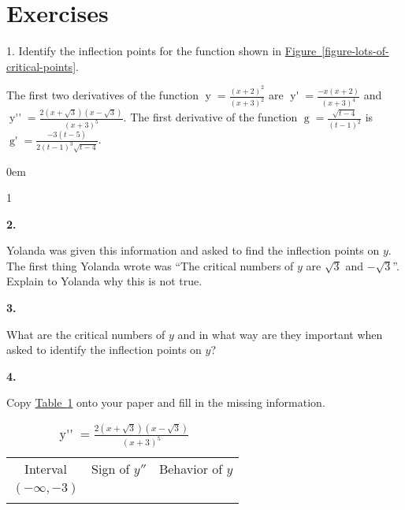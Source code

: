 \documentclass[12pt,]{book}
\theoremstyle{plain}
\theoremstyle{definition}
\numberwithin{equation}{section}
\newcommand{\hrulethin}  {\noalign{\hrule height 0.04em}}
\newcommand{\hrulemedium}{\noalign{\hrule height 0.07em}}
\newcommand{\hrulethick} {\noalign{\hrule height 0.11em}}
\newenvironment{exercisegroup}%
{\medskip\noindent}%
{\par\bigskip}%
\newlength{\exercisegroupindent}%
\newlength{\exercisegroupitemwidth}%
\newenvironment{exercisegrouplist}%
{\vspace{-\partopsep}%
\begin{adjustwidth}{\exercisegroupindent}{0em}}%
{\end{adjustwidth}%
\vspace{-\partopsep}%
\vspace{\baselineskip}}%
\newenvironment{exercisegroupbycol}[1]%
{\begin{exercisegrouplist}%
\vspace{-\multicolsep}%
\begin{multicols}{#1}%
\setlength{\parindent}{0em}%
\setlength{\exercisegroupitemwidth}{\linewidth}}%
{\end{multicols}%
\vspace{-\multicolsep}%
\end{exercisegrouplist}}%
\newenvironment{exercisegroupitem}[1]%
{\begin{minipage}[t]{\exercisegroupitemwidth}
\vspace{0pt}%
{\bfseries#1}%
\rule{0pt}{\baselineskip}}{\strut%
\end{minipage}%
\hspace{\columnsep}}%
\providecommand\phantomsection{}
\newcommand{\fe}[2]{\mathop{{#1}{\left(#2\right)}}}
\newcommand{\ointerval}[2]{\left(#1,#2\right)}
\newcommand{\fd}[1]{#1'}
\newcommand{\sd}[1]{#1''}
\begin{document}
\section*{Exercises}\label{exercises-50}

\begin{exerciselist}
\item[1.]\phantomsection\hypertarget{exercise-428}{\null}Identify the inflection points for the function shown in \hyperref[figure-lots-of-critical-points]{Figure~\ref*{figure-lots-of-critical-points}}.%
\par\smallskip
\begin{exercisegroup}%
The first two derivatives of the function \(\fe{y}{x}=\frac{(x+2)^2}{(x+3)^2}\) are \(\fe{\fd{y}}{x}=\frac{-x(x+2)}{(x+3)^4}\) and \(\fe{\sd{y}}{x}=\frac{2(x+\sqrt{3})(x-\sqrt{3})}{(x+3)^5}\). The first derivative of the function \(\fe{g}{t}=\frac{\sqrt{t-4}}{(t-1)^2}\) is \(\fe{\fd{g}}{t}=\frac{-3(t-5)}{2(t-1)^3\sqrt{t-4}}\).%
\par
\begin{exercisegroupbycol}{1}%
\begin{exercisegroupitem}{2. }\phantomsection\hypertarget{exercise-429}{\null}
Yolanda was given this information and asked to find the inflection points on \(y\).  The first thing Yolanda wrote was ``The critical numbers of \(y\) are \(\sqrt{3}\) and \(-\sqrt{3}\)''.  Explain to Yolanda why this is not true.%
\end{exercisegroupitem}%
\par%
\begin{exercisegroupitem}{3. }\phantomsection\hypertarget{exercise-430}{\null}
What are the critical numbers of \(y\) and in what way are they important when asked to identify the inflection points on \(y\)?%
\end{exercisegroupitem}%
\par%
\begin{exercisegroupitem}{4. }\phantomsection\hypertarget{exercise-431}{\null}
Copy \hyperref[table-second-derivative-signs]{Table~\ref*{table-second-derivative-signs}} onto your paper and fill in the missing information.%
\begin{table}
\centering
\caption{\(\fe{\sd{y}}{x}=\frac{2\left(x+\sqrt{3}\right)\left(x-\sqrt{3}\right)}{(x+3)^5}\)\label{table-second-derivative-signs}}
\begin{tabular}{ccc}\hrulethick
Interval&Sign of \(\sd{y}\)&Behavior of \(y\)\\\hrulemedium
\(\ointerval{-\infty}{-3}\)&&\\\hrulethin

\end{tabular}
\end{table}
\end{exercisegroupitem}
\end{exercisegroupbycol}
\end{exercisegroup}
\end{exerciselist}
\end{document}
